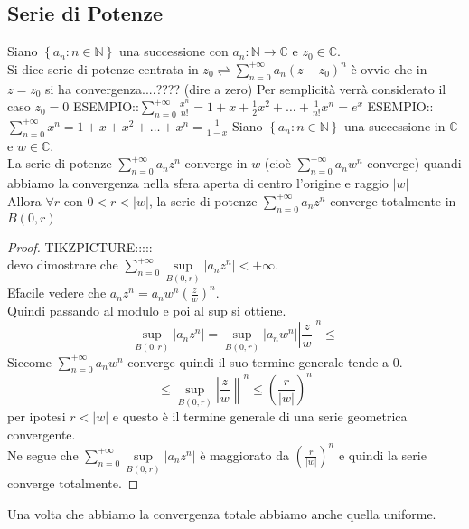 \subsection{Serie di Potenze}
Siano $\left\{a_n:n\in\mathbb{N}\right\}$ una successione con $a_n:\mathbb{N}\to\mathbb{C}$ e $z_0\in\mathbb{C}$.\\
Si dice serie di potenze centrata in $z_0 \rightleftharpoons \sum\limits_{n=0}^{+\infty}a_n\left(z-z_0\right)^n$ 
\observation
è ovvio che in $z=z_0$ si ha convergenza....???? (dire a zero)
\observation
Per semplicità verrà considerato il caso $z_0=0$
ESEMPIO::$\sum\limits_{n=0}^{+\infty}\frac{x^n}{n!}=1+x+\frac{1}{2} x^2+\ldots+\frac{1}{n!}x^n=e^x$ 
ESEMPIO::$\sum\limits_{n=0}^{+\infty}x^n=1+x+x^2+\ldots+x^n=\frac{1}{1-x}$
\proposition
Siano $\left\{a_n:n\in\mathbb{N}\right\}$ una successione in $\mathbb{C}$ e $w\in\mathbb{C}$.\\
La serie di potenze $\sum\limits_{n=0}^{+\infty}a_nz^n$ converge in $w$ (cioè $\sum\limits_{n=0}^{+\infty}a_nw^n$ converge) quandi abbiamo la convergenza nella sfera aperta di centro l'origine e raggio $\left|w\right|$\\
Allora $\forall r$ con $0<r<\left| w \right|$, la serie di potenze $\sum\limits_{n=0}^{+\infty}a_nz^n$ converge totalmente in $B(0,r)$\\
\begin{proof}
	TIKZPICTURE:::::\\
	devo dimostrare che $\sum\limits_{n=0}^{+\infty}\sup\limits_{B(0,r)}\left|a_nz^n\right|<+\infty$.\\
	E\' facile vedere che $a_nz^n=a_nw^n\left(\frac{z}{w}\right)^n$.\\
	Quindi passando al modulo e poi al sup si ottiene.\\
	$$\sup\limits_{B(0,r)}\left|a_nz^n\right|=\sup\limits_{B(0,r)}\left|a_nw^n\right|\left|\frac{z}{w} \right|^n\le$$
	Siccome $\sum\limits_{n=0}^{+\infty}a_nw^n$ converge  quindi il suo termine generale tende a $0$.\\
	$$\le\sup\limits_{B(0,r)}\left|\frac{z}{w}\right\|^n\le\left(\frac{r}{\left|w\right|}\right)^n $$
	per ipotesi $r<\left|w\right|$ e questo è il termine generale di una serie geometrica convergente.\\
	Ne segue che $\sum\limits_{n=0}^{+\infty}\sup\limits_{B(0,r)}\left|a_nz^n\right|$ è maggiorato da $\left( \frac{r}{\left|w\right|}\right)^n$ e quindi la serie converge totalmente.
\end{proof}
\observation
Una volta che abbiamo la convergenza totale abbiamo anche quella uniforme.
